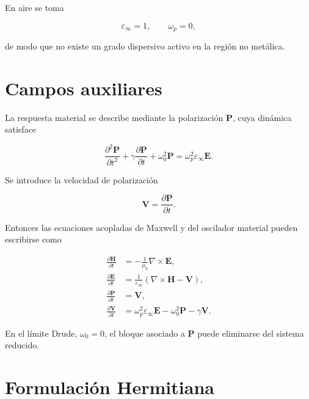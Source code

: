 \documentclass[11pt,a4paper]{article}
\newcommand{\epsinf}{\varepsilon_\infty}
\newcommand{\omegap}{\omega_p}
\newcommand{\omegao}{\omega_0}
\newcommand{\vect}[1]{\bm{#1}}
\begin{document}
En aire se toma

\begin{equation}
  \epsinf = 1,
  \qquad
  \omegap = 0,
\end{equation}

de modo que no existe un grado dispersivo activo en la región no metálica.

\section{Campos auxiliares}

La respuesta material se describe mediante la polarización $\vect{P}$, cuya
dinámica satisface

\begin{equation}
  \frac{\partial^2 \vect{P}}{\partial t^2}
  +
  \gamma
  \frac{\partial \vect{P}}{\partial t}
  +
  \omegao^2 \vect{P}
  =
  \omegap^2 \epsinf \vect{E}.
  \label{eq:polarization}
\end{equation}

Se introduce la velocidad de polarización

\begin{equation}
  \vect{V}
  =
  \frac{\partial \vect{P}}{\partial t}.
  \label{eq:v_def}
\end{equation}

Entonces las ecuaciones acopladas de Maxwell y del oscilador material pueden
escribirse como

\begin{align}
  \frac{\partial \vect{H}}{\partial t}
  &=
  -\frac{1}{\mu_0}\nabla\times\vect{E},
  \label{eq:h_time}
  \\
  \frac{\partial \vect{E}}{\partial t}
  &=
  \frac{1}{\epsinf}
  \left(
    \nabla\times\vect{H} - \vect{V}
  \right),
  \label{eq:e_time}
  \\
  \frac{\partial \vect{P}}{\partial t}
  &=
  \vect{V},
  \label{eq:p_time}
  \\
  \frac{\partial \vect{V}}{\partial t}
  &=
  \omegap^2\epsinf\vect{E}
  -
  \omegao^2\vect{P}
  -
  \gamma\vect{V}.
  \label{eq:v_time}
\end{align}

En el límite Drude, $\omegao=0$, el bloque asociado a $\vect{P}$ puede
eliminarse del sistema reducido.

\section{Formulación Hermitiana}
\end{document}
